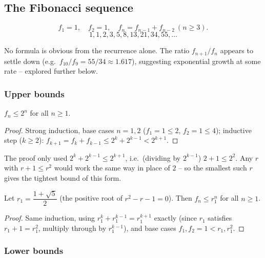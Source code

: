 \documentclass[11pt]{article}
\begin{document}
\subsection{The Fibonacci sequence}
\label{sec:6-7}

\begin{definition}
\[
f_1=1,\quad f_2=1,\quad f_n=f_{n-1}+f_{n-2}\ (n\ge3).
\]
\[
1,1,2,3,5,8,13,21,34,55,\dots
\]
\end{definition}

\begin{note}
No formula is obvious from the recurrence alone. The ratio $f_{n+1}/f_n$ appears to settle down (e.g.\ $f_{10}/f_9=55/34\approx1.617$), suggesting exponential growth at some rate -- explored further below.
\end{note}

\subsubsection{Upper bounds}
\label{sec:6-7-1}

\begin{theorem}
$f_n \le 2^n$ for all $n\ge1$.
\end{theorem}
\begin{proof}
Strong induction, base cases $n=1,2$ ($f_1=1\le2$, $f_2=1\le4$); inductive step ($k\ge2$): $f_{k+1}=f_k+f_{k-1}\le2^k+2^{k-1}<2^{k+1}$.
\end{proof}

\begin{note}
The proof only used $2^k+2^{k-1}\le2^{k+1}$, i.e.\ (dividing by $2^{k-1}$) $2+1\le2^2$. Any $r$ with $r+1\le r^2$ would work the same way in place of $2$ -- so the smallest such $r$ gives the tightest bound of this form.
\end{note}

\begin{theorem}
Let $r_1 = \dfrac{1+\sqrt5}{2}$ (the positive root of $r^2-r-1=0$). Then $f_n \le r_1^n$ for all $n\ge1$.
\end{theorem}
\begin{proof}
Same induction, using $r_1^k+r_1^{k-1}=r_1^{k+1}$ exactly (since $r_1$ satisfies $r_1+1=r_1^2$, multiply through by $r_1^{k-1}$), and base cases $f_1,f_2=1 < r_1,r_1^2$.
\end{proof}

\subsubsection{Lower bounds}
\label{sec:6-7-2}
\end{document}
